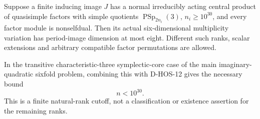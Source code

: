\begin{theorem}
\label{D-HOS-15}
Suppose a finite inducing image $J$ has a normal irreducibly acting
central product of quasisimple factors with simple quotients
$\operatorname{PSp}_{2n_i}(3)$, $n_i\ge10^{30}$, and every
factor module is nonselfdual. Then its actual six-dimensional
multiplicity variation has period-image dimension at most eight.
Different such ranks, scalar extensions and arbitrary compatible
factor permutations are allowed.

In the transitive characteristic-three symplectic-core case of
the main imaginary-quadratic sixfold problem, combining this with
D-HOS-12 gives the necessary bound
\[
                                  n<10^{30}.
 \tag{HOS3C.12}
\]
This is a finite natural-rank cutoff, not a classification or
existence assertion for the remaining ranks.
\end{theorem}

